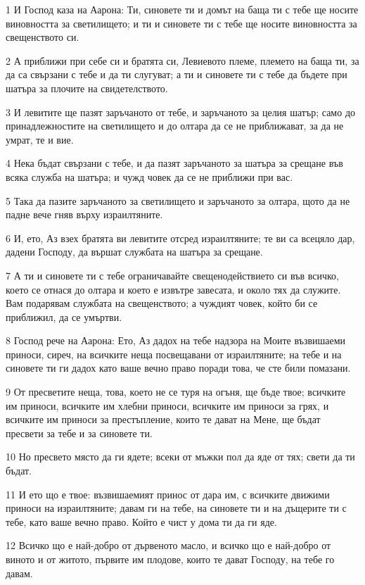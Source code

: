 \par 1 И Господ каза на Аарона: Ти, синовете ти и домът на баща ти с тебе ще носите виновността за светилището; и ти и синовете ти с тебе ще носите виновността за свещенството си.
\par 2 А приближи при себе си и братята си, Левиевото племе, племето на баща ти, за да са свързани с тебе и да ти слугуват; а ти и синовете ти с тебе да бъдете при шатъра за плочите на свидетелството.
\par 3 И левитите ще пазят заръчаното от тебе, и заръчаното за целия шатър; само до принадлежностите на светилището и до олтара да се не приближават, за да не умрат, те и вие.
\par 4 Нека бъдат свързани с тебе, и да пазят заръчаното за шатъра за срещане във всяка служба на шатъра; и чужд човек да се не приближи при вас.
\par 5 Така да пазите заръчаното за светилището и заръчаното за олтара, щото да не падне вече гняв върху израилтяните.
\par 6 И, ето, Аз взех братята ви левитите отсред израилтяните; те ви са всецяло дар, дадени Господу, да вършат службата на шатъра за срещане.
\par 7 А ти и синовете ти с тебе ограничавайте свещенодействието си във всичко, което се отнася до олтара и което е извътре завесата, и около тях да служите. Вам подарявам службата на свещенството; а чуждият човек, който би се приближил, да се умъртви.
\par 8 Господ рече на Аарона: Ето, Аз дадох на тебе надзора на Моите възвишаеми приноси, сиреч, на всичките неща посвещавани от израилтяните; на тебе и на синовете ти ги дадох като ваше вечно право поради това, че сте били помазани.
\par 9 От пресветите неща, това, което не се туря на огъня, ще бъде твое; всичките им приноси, всичките им хлебни приноси, всичките им приноси за грях, и всичките им приноси за престъпление, които те дават на Мене, ще бъдат пресвети за тебе и за синовете ти.
\par 10 Но пресвето място да ги ядете; всеки от мъжки пол да яде от тях; свети да ти бъдат.
\par 11 И ето що е твое: възвишаемият принос от дара им, с всичките движими приноси на израилтяните; давам ги на тебе, на синовете ти и на дъщерите ти с тебе, като ваше вечно право. Който е чист у дома ти да ги яде.
\par 12 Всичко що е най-добро от дървеното масло, и всичко що е най-добро от виното и от житото, първите им плодове, които те дават Господу, на тебе го давам.
